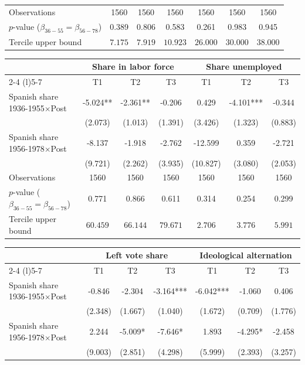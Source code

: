 \begin{table}[!h]
\begin{tabular*}{\textwidth}{l@{\extracolsep{\fill}}cccccc}
\addlinespace
Observations & 1560 & 1560 & 1560 & 1560 & 1560 & 1560\\
$p$-value ($\beta_{36{-}55} = \beta_{56{-}78}$) & 0.389 & 0.806 & 0.583 & 0.261 & 0.983 & 0.945\\
Tercile upper bound & $7.175$ & $7.919$ & $10.923$ & $26.000$ & $30.000$ & $38.000$\\
\hline
\end{tabular*}
\begin{tabular*}{\textwidth}{l@{\extracolsep{\fill}}cccccc}
 & \multicolumn{3}{c}{Share in labor force} & \multicolumn{3}{c}{Share unemployed} \\
\cmidrule(l){2-4} \cmidrule(l){5-7}
  & T1 & T2 & T3 & T1  & T2  & T3 \\
\hline
Spanish share 1936-1955$\times$Post & -5.024** & -2.361** & -0.206 & 0.429 & -4.101*** & -0.344\\
 & (2.073) & (1.013) & (1.391) & (3.426) & (1.323) & (0.883)\\
Spanish share 1956-1978$\times$Post & -8.137 & -1.918 & -2.762 & -12.599 & 0.359 & -2.721\\
 & (9.721) & (2.262) & (3.935) & (10.827) & (3.080) & (2.053)\\

\addlinespace
Observations & 1560 & 1560 & 1560 & 1560 & 1560 & 1560\\
$p$-value ($\beta_{36{-}55} = \beta_{56{-}78}$) & 0.771 & 0.866 & 0.611 & 0.314 & 0.254 & 0.299\\
Tercile upper bound & $60.459$ & $66.144$ & $79.671$ & $2.706$ & $3.776$ & $5.991$\\
\hline
\end{tabular*}
\begin{tabular*}{\textwidth}{l@{\extracolsep{\fill}}cccccc}
 & \multicolumn{3}{c}{Left vote share} & \multicolumn{3}{c}{Ideological alternation} \\
\cmidrule(l){2-4} \cmidrule(l){5-7}
  & T1 & T2 & T3 & T1  & T2  & T3 \\
\hline
Spanish share 1936-1955$\times$Post & -0.846 & -2.304 & -3.164*** & -6.042*** & -1.060 & 0.406\\
 & (2.348) & (1.667) & (1.040) & (1.672) & (0.709) & (1.776)\\
Spanish share 1956-1978$\times$Post & 2.244 & -5.009* & -7.646* & 1.893 & -4.295* & -2.458\\
 & (9.003) & (2.851) & (4.298) & (5.999) & (2.393) & (3.257)\\


\end{tabular*}
\end{table}
